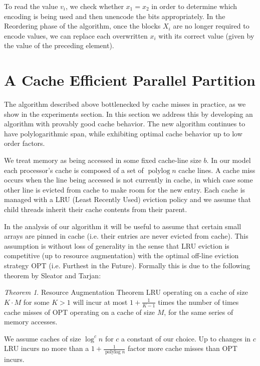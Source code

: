 \documentclass[sigconf]{acmart}
\renewcommand{\paragraph}[1]{\vspace{0.09in}\noindent{\bf \boldmath #1.}}
\theoremstyle{remark}
\newtheorem{theorem}{Theorem}[section]
\theoremstyle{remark}
\begin{document}
To read the value $v_i$, we check whether $x_1 = x_2$ in order to
determine which encoding is being used and then unencode the bits
appropriately. In the Reordering phase of the algorithm, once the
blocks $X_i$ are no longer required to encode values, we can replace
each overwritten $x_i$ with its correct value (given by the value of
the preceding element).

\section{A Cache Efficient Parallel Partition}

The algorithm described above bottlenecked by cache misses in practice, as we show in the experiments section. 
In this section we address this by developing an algorithm with provably good cache behavior. 
The new algorithm continues to have polylogarithmic span, while exhibiting optimal cache behavior up to low order factors.

\paragraph{Modelling Cache Misses}
We treat memory as being accessed in some fixed cache-line size $b$. 
In our model each processor's cache is composed of a set of $\operatorname{polylog}{n}$ cache lines.
A cache miss occurs when the line being accessed is not currently in cache, in which case some other line is evicted from cache to make room for the new entry.
Each cache is managed with a LRU (Least Recently Used) eviction policy and we assume that child threads inherit their cache contents from their parent.

In the analysis of our algorithm it will be useful to assume that certain small arrays are pinned in cache (i.e. their entries are never evicted from cache).
This assumption is without loss of generality in the sense that LRU eviction is competitive (up to resource augmentation) with the optimal off-line eviction strategy OPT (i.e. Furthest in the Future).
Formally this is due to the following theorem by Sleator and Tarjan:
\begin{theorem}{Resource Augmentation Theorem \cite{SleatorTa85}}
	LRU operating on a cache of size $K\cdot M$ for some $K>1$ will incur at most $1+\frac{1}{K-1}$ times the number of times cache misses of OPT operating on a cache of size $M$, for the same series of memory accesses.
\end{theorem}

We assume caches of size $\log^c n$ for $c$ a constant of our choice. 
Up to changes in $c$ LRU incurs no more than a $1+\frac{1}{\operatorname{polylog}{n}}$ factor more cache misses than OPT incurs.
\end{document}
